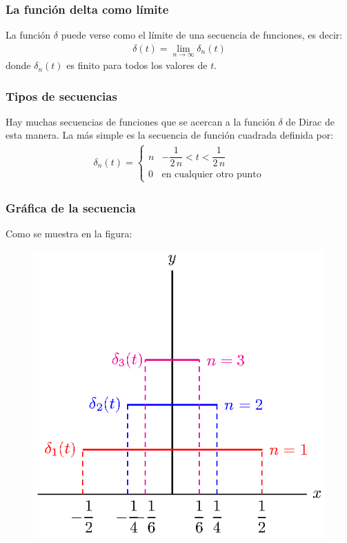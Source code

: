 \documentclass[12pt]{beamer}
\begin{document}
\begin{frame}
\frametitle{La función delta como límite}
La función $\delta$ puede verse como el límite de una secuencia de funciones, es decir:
\pause
\begin{align}
\delta(t) = \lim_{n \to \infty} \delta_{n} (t)
\label{eq:ecuacion_05_10}
\end{align}
donde $\delta_{n}(t)$ es finito para todos los valores de $t$.
\end{frame}
\begin{frame}
\frametitle{Tipos de secuencias}
Hay muchas secuencias de funciones que se acercan a la función $\delta$ de Dirac de esta manera. La más simple es la secuencia de función cuadrada definida por:
\begin{align}
\delta_{n} (t) = \begin{cases}
n & -\dfrac{1}{2 \, n} < t < \dfrac{1}{2 \, n} \\
0 & \mbox{en cualquier otro punto}
\end{cases}
\label{eq:ecuacion_05_11}
\end{align}
\end{frame}
\begin{frame}
\frametitle{Gráfica de la secuencia}
Como se muestra en la figura:
\begin{figure}[H]
    \centering
    \includegraphics[scale=0.9]{Imagenes/plot_secuencia_delta_02.eps}
\end{figure}
\end{frame}
\end{document}
